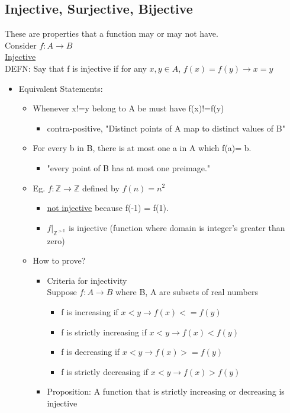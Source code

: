 \documentclass{article}
\begin{document}
\subsection{Injective, Surjective, Bijective}
These are properties that a function may or may not have.\\
Consider $f: A \rightarrow B$\\

\underline{Injective}\\

DEFN: Say that f is injective if for any $x,y \in A$, $f(x)=f(y) \rightarrow x=y$\\
\begin{itemize}
\item Equivalent Statements:
\begin{itemize}
\item Whenever x!=y belong to A be must have f(x)!=f(y)
\begin{itemize}
\item contra-positive, "Distinct points of A map to distinct values of B"
\end{itemize}
\item For every b in B, there is at most one a in A which f(a)= b.
\begin{itemize}
\item "every point of B has at most one preimage."
\end{itemize}
\item Eg. $f:\mathbb{Z} \rightarrow \mathbb{Z}$ defined by $f(n) = n^2$
\begin{itemize}
\item \underline{not injective} because f(-1) = f(1).
\item $f|_{\mathbb{Z^{> 0}}}$ is injective (function where domain is integer's greater than zero)
\end{itemize}
\item How to prove?
\begin{itemize}
\item Criteria for injectivity\\
		Suppose $f: A \rightarrow B$ where B, A are subsets of real numbers
\begin{itemize}
\item f is increasing if $x<y \rightarrow f(x) <= f(y)$
\item f is strictly increasing if $x<y \rightarrow f(x) < f(y)$
\item f is decreasing if $x<y \rightarrow f(x) >= f(y)$
\item f is strictly decreasing if $x<y \rightarrow f(x) > f(y)$
\end{itemize}
\item Proposition: A function that is strictly increasing or decreasing is injective
\end{itemize}
\end{itemize}
\end{itemize}









\end{document}
